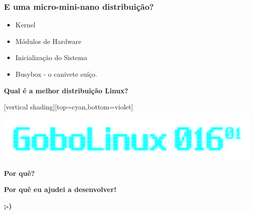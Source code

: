 \documentclass[aspectratio=169,14pt]{beamer}
\begin{document}
\begin{frame}
    \frametitle{E uma micro-mini-nano distribuição?}
    \begin{itemize}
        \item Kernel
        \item Módulos de Hardware
        \item Inicialização do Sistema
        \item Busybox - o canivete suíço.
    \end{itemize}
\end{frame}

\begin{frame}
    \begin{center}
    \huge \textbf{Qual é a melhor distribuição Linux?}
    \end{center}
\end{frame}

{
 [vertical shading][top=cyan,bottom=violet]
\begin{frame}
    \includegraphics[width=0.9\paperwidth]{../../images/gobolinux.png}
\end{frame}
}

\begin{frame}
    \begin{center}
    \huge \textbf{Por quê?}
    \end{center}
\end{frame}

\begin{frame}
    \begin{center}
    \huge \textbf{Por quê eu ajudei a desenvolver!}

    \huge \textbf{;-)}
    \end{center}
\end{frame}
\end{document}
